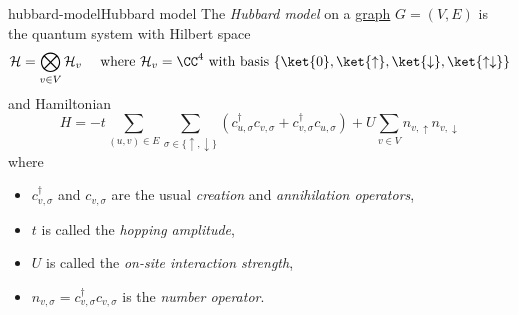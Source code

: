 \begin{topic}{hubbard-model}{Hubbard model}
    The \emph{Hubbard model} on a \href{/math-definitions/#CO:graph}{graph} $G = (V, E)$ is the quantum system with Hilbert space
    \[ \mathcal{H} = \bigotimes_{v \in V} \mathcal{H}_v \quad \textup{ where } \mathcal{H}_v = \CC^4 \textup{ with basis } \{ \ket{0}, \ket{\uparrow}, \ket{\downarrow}, \ket{\uparrow \downarrow} \} \]
    and Hamiltonian
    \[ H = - t \sum_{(u, v) \in E} \sum_{\sigma \in \{ \uparrow, \downarrow \}} \left( c_{u, \sigma}^\dagger c_{v, \sigma} + c_{v, \sigma}^\dagger c_{u, \sigma} \right) + U \sum_{v \in V} n_{v, \uparrow} n_{v, \downarrow} \]
    where
    \begin{itemize}
        \item $c_{v, \sigma}^\dagger$ and $c_{v, \sigma}$ are the usual \textit{creation} and \textit{annihilation operators},
        \item $t$ is called the \textit{hopping amplitude},
        \item $U$ is called the \textit{on-site interaction strength},
        \item $n_{v, \sigma} = c_{v, \sigma}^\dagger c_{v, \sigma}$ is the \textit{number operator}.
    \end{itemize}
\end{topic}
